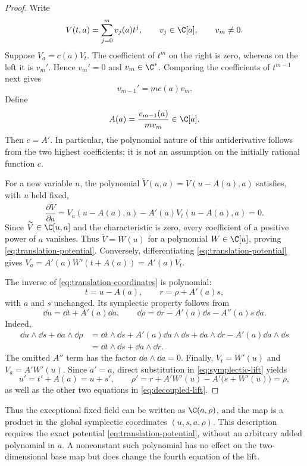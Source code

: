 \begin{proof}
Write
\[
 V(t,a)=\sum_{j=0}^m v_j(a)t^j,\qquad
 v_j\in\C[a],\qquad v_m\ne0.
\]
Suppose $V_a=c(a)V_t$. The coefficient of $t^m$ on the right is zero,
whereas on the left it is $v_m'$. Hence $v_m'=0$ and
$v_m\in\C^*$. Comparing the coefficients of $t^{m-1}$ next gives
\[
 v_{m-1}'=m c(a)v_m.
\]
Define
\begin{equation}
 A(a)=\frac{v_{m-1}(a)}{m v_m}\in\C[a].
 \label{eq:translation-from-top-coefficients}
\end{equation}
Then $c=A'$. In particular, the polynomial nature of this antiderivative
follows from the two highest coefficients; it is not an assumption on
the initially rational function $c$.

For a new variable $u$, the polynomial
$\widetilde V(u,a)=V(u-A(a),a)$ satisfies, with $u$ held fixed,
\[
 \frac{\partial\widetilde V}{\partial a}
 =V_a(u-A(a),a)-A'(a)V_t(u-A(a),a)=0.
\]
Since $\widetilde V\in\C[u,a]$ and the characteristic is zero, every
coefficient of a positive power of $a$ vanishes. Thus
$\widetilde V=W(u)$ for a polynomial $W\in\C[u]$, proving
\eqref{eq:translation-potential}. Conversely, differentiating
\eqref{eq:translation-potential} gives
$V_a=A'(a)W'(t+A(a))=A'(a)V_t$.

The inverse of \eqref{eq:translation-coordinates} is polynomial:
\[
 t=u-A(a),\qquad r=\rho+A'(a)s,
\]
with $a$ and $s$ unchanged. Its symplectic property follows from
\[
 \dd u=\dd t+A'(a)\dd a,\qquad
 \dd\rho=\dd r-A'(a)\dd s-A''(a)s\,\dd a.
\]
Indeed,
\begin{align*}
 \dd u\wedge\dd s+\dd a\wedge\dd\rho
 &=\dd t\wedge\dd s+A'(a)\dd a\wedge\dd s
   +\dd a\wedge\dd r-A'(a)\dd a\wedge\dd s\\
 &=\dd t\wedge\dd s+\dd a\wedge\dd r.
\end{align*}
The omitted $A''$ term has the factor $\dd a\wedge\dd a=0$.
Finally, $V_t=W'(u)$ and $V_a=A'W'(u)$. Since $a'=a$, direct substitution
in \eqref{eq:symplectic-lift} yields
\[
 u'=t'+A(a)=u+s',\qquad
 \rho'=r+A'W'(u)-A'\bigl(s+W'(u)\bigr)=\rho,
\]
as well as the other two equations in \eqref{eq:decoupled-lift}.
\end{proof}

Thus the exceptional fixed field can be written as $\C(a,\rho)$, and
the map is a product in the global symplectic coordinates $(u,s,a,\rho)$.
This description requires the exact potential
\eqref{eq:translation-potential}, without an arbitrary added polynomial in
$a$. A nonconstant such polynomial has no effect on the two-dimensional
base map but does change the fourth equation of the lift.

